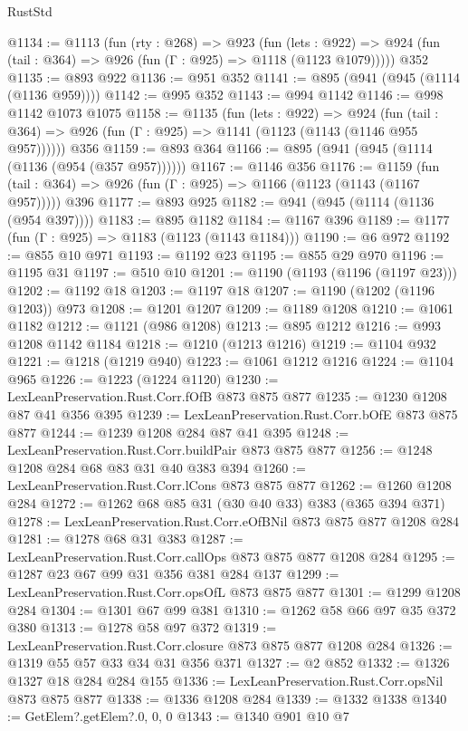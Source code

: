 \begin{lexlean}{RustStd}
\begin{coremodule}
{\begin{coremodule}
{{{{{{{{{@1134 := @1113
    (fun (rty : @268) =>
    @923
      (fun (lets : @922) =>
      @924 (fun (tail : @364) => @926 (fun (Γ : @925) => @1118 (@1123 @1079)))))
    @352
@1135 := @893 @922
@1136 := @951 @352
@1141 := @895 (@941 (@945 (@1114 (@1136 @959))))
@1142 := @995 @352
@1143 := @994 @1142
@1146 := @998 @1142 @1073 @1075
@1158 := @1135
    (fun (lets : @922) =>
    @924 (fun (tail : @364) => @926 (fun (Γ : @925) => @1141 (@1123 (@1143 (@1146 @955 @957))))))
    @356
@1159 := @893 @364
@1166 := @895 (@941 (@945 (@1114 (@1136 (@954 (@357 @957))))))
@1167 := @1146 @356
@1176 := @1159
    (fun (tail : @364) => @926 (fun (Γ : @925) => @1166 (@1123 (@1143 (@1167 @957)))))
    @396
@1177 := @893 @925
@1182 := @941 (@945 (@1114 (@1136 (@954 @397))))
@1183 := @895 @1182
@1184 := @1167 @396
@1189 := @1177 (fun (Γ : @925) => @1183 (@1123 (@1143 @1184)))
@1190 := @6 @972
@1192 := @855 @10 @971
@1193 := @1192 @23
@1195 := @855 @29 @970
@1196 := @1195 @31
@1197 := @510 @10
@1201 := @1190 (@1193 (@1196 (@1197 @23)))
@1202 := @1192 @18
@1203 := @1197 @18
@1207 := @1190 (@1202 (@1196 @1203)) @973
@1208 := @1201 @1207
@1209 := @1189 @1208
@1210 := @1061 @1182
@1212 := @1121 (@986 @1208)
@1213 := @895 @1212
@1216 := @993 @1208 @1142 @1184
@1218 := @1210 (@1213 @1216)
@1219 := @1104 @932
@1221 := @1218 (@1219 @940)
@1223 := @1061 @1212 @1216
@1224 := @1104 @965
@1226 := @1223 (@1224 @1120)
@1230 := LexLeanPreservation.Rust.Corr.fOfB @873 @875 @877
@1235 := @1230 @1208 @87 @41 @356 @395
@1239 := LexLeanPreservation.Rust.Corr.bOfE @873 @875 @877
@1244 := @1239 @1208 @284 @87 @41 @395
@1248 := LexLeanPreservation.Rust.Corr.buildPair @873 @875 @877
@1256 := @1248 @1208 @284 @68 @83 @31 @40 @383 @394
@1260 := LexLeanPreservation.Rust.Corr.lCons @873 @875 @877
@1262 := @1260 @1208 @284
@1272 := @1262 @68 @85 @31 (@30 @40 @33) @383 (@365 @394 @371)
@1278 := LexLeanPreservation.Rust.Corr.eOfBNil @873 @875 @877 @1208 @284
@1281 := @1278 @68 @31 @383
@1287 := LexLeanPreservation.Rust.Corr.callOps @873 @875 @877 @1208 @284
@1295 := @1287 @23 @67 @99 @31 @356 @381 @284 @137
@1299 := LexLeanPreservation.Rust.Corr.opsOfL @873 @875 @877
@1301 := @1299 @1208 @284
@1304 := @1301 @67 @99 @381
@1310 := @1262 @58 @66 @97 @35 @372 @380
@1313 := @1278 @58 @97 @372
@1319 := LexLeanPreservation.Rust.Corr.closure @873 @875 @877 @1208 @284
@1326 := @1319 @55 @57 @33 @34 @31 @356 @371
@1327 := @2 @852
@1332 := @1326 @1327 @18 @284 @284 @155
@1336 := LexLeanPreservation.Rust.Corr.opsNil @873 @875 @877
@1338 := @1336 @1208 @284
@1339 := @1332 @1338
@1340 := GetElem?.getElem?.{0, 0, 0}
@1343 := @1340 @901 @10 @7
}}}}}}}}}
\end{coremodule}}
\end{coremodule}
\end{lexlean}
